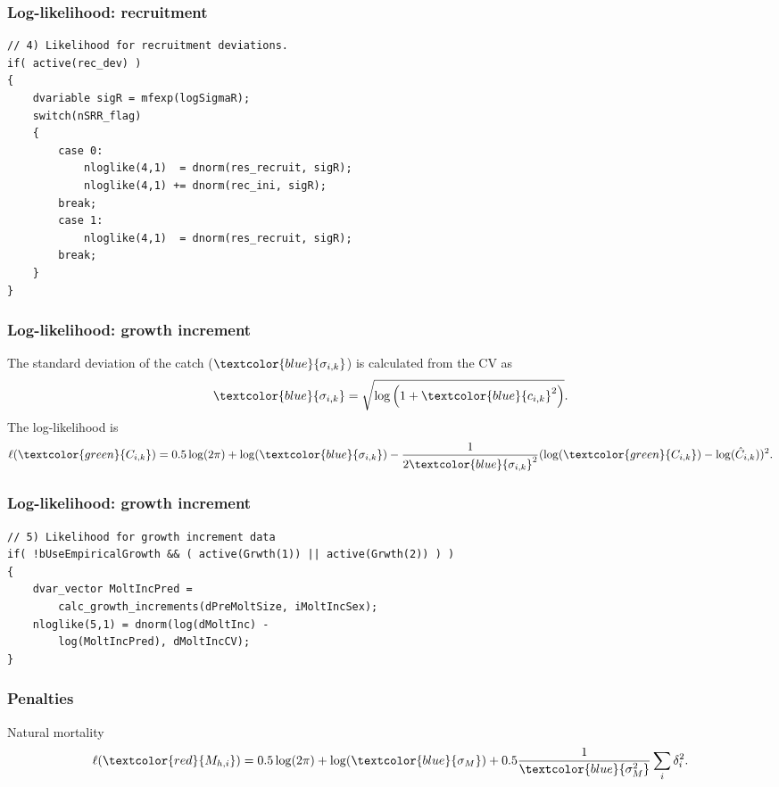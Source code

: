 \documentclass{beamer}
\begin{document}
\begin{frame}[fragile]
\frametitle{Log-likelihood: recruitment}
\begin{verbatim}
// 4) Likelihood for recruitment deviations.
if( active(rec_dev) )
{
    dvariable sigR = mfexp(logSigmaR);
    switch(nSRR_flag)
    {
        case 0:  
            nloglike(4,1)  = dnorm(res_recruit, sigR);
            nloglike(4,1) += dnorm(rec_ini, sigR);
        break;
        case 1:
            nloglike(4,1)  = dnorm(res_recruit, sigR);
        break;
    }
}
\end{verbatim}
\end{frame}


\begin{frame}
\frametitle{Log-likelihood: growth increment}
The standard deviation of the catch ($\textcolor{blue}{\sigma_{i,k}}$) is calculated
from the CV as
\begin{equation*}
  \textcolor{blue}{\sigma_{i,k}} = \sqrt{\log \left( 1+\textcolor{blue}{c_{i,k}}^2 \right)}.
\end{equation*}
The log-likelihood is
\begin{equation*}
  \ell(\textcolor{green}{C_{i,k}}) = 0.5 \log (2 \pi) + \log
  (\textcolor{blue}{\sigma_{i,k}}) -
  \frac{1}{2\textcolor{blue}{\sigma_{i,k}}^2} (\log (\textcolor{green}{C_{i,k}})
  - \log (\hat{C}_{i,k}))^2.
\end{equation*}
\end{frame}

\begin{frame}[fragile]
\frametitle{Log-likelihood: growth increment}
\begin{verbatim}
// 5) Likelihood for growth increment data
if( !bUseEmpiricalGrowth && ( active(Grwth(1)) || active(Grwth(2)) ) )
{
    dvar_vector MoltIncPred = 
        calc_growth_increments(dPreMoltSize, iMoltIncSex);
    nloglike(5,1) = dnorm(log(dMoltInc) - 
        log(MoltIncPred), dMoltIncCV);
}
\end{verbatim}
\end{frame}


\begin{frame}
\frametitle{Penalties}
Natural mortality
\begin{equation*}
  \ell(\textcolor{red}{M_{h,i}}) = 
  0.5 \log (2 \pi) + \log (\textcolor{blue}{\sigma_{M}}) + 0.5
  \frac{1}{\textcolor{blue}{\sigma^2_{M}}} \sum_i
  \delta_i^2.
\end{equation*}
\end{frame}
\end{document}

